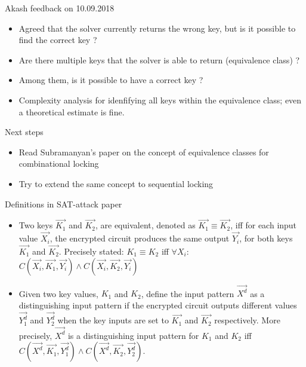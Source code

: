 \begin{frame}{Akash feedback on 10.09.2018}
\begin{itemize}
\item Agreed that the solver currently returns the wrong key, but is it possible to find the correct key ?
\item Are there multiple keys that the solver is able to return (equivalence class) ?
\item Among them, is it possible to have a correct key ?
\item Complexity analysis for idenfifying all keys within the equivalence class; even a theoretical estimate is fine. 
\end{itemize}
\end{frame}

\begin{frame}{Next steps}
	\begin{itemize}
		\item Read Subramanyan's paper on the concept of equivalence classes for combinational locking
		\item Try to \alert{extend} the same concept to sequential locking
	\end{itemize}
\end{frame}

\begin{frame}{Definitions in SAT-attack paper}
	\begin{itemize}
		\item Two keys $\vec{K_1}$ and $\vec{K_2}$, are equivalent, denoted as $\vec{K_1} \equiv \vec{K_2}$, iff for each input value $\vec{X_i}$, the encrypted circuit produces the same output $\vec{Y_i}$, for both keys $\vec{K_1}$ and $\vec{K_2}$. Precisely stated: $K_1 \equiv K_2$ iff $\forall X_i$: $C(\vec{X_i}, \vec{K_1}, \vec{Y_i}) \wedge C(\vec{X_i}, \vec{K_2}, \vec{Y_i})$
		\item Given two key values, $K_1$ and $K_2$, define the input pattern $\vec{X^d}$ as a distinguishing input pattern if the encrypted circuit outputs different values $\vec{Y_1^d}$ and $\vec{Y_2^d}$ when the key inputs are set to $\vec{K_1}$ and $\vec{K_2}$ respectively. More precisely, $\vec{X^d}$ is a distinguishing input pattern for $K_1$ and $K_2$ iff $C(\vec{X^d}, \vec{K_1}, \vec{Y_1^d}) \wedge C(\vec{X^d}, \vec{K_2}, \vec{Y_2^d})$. 
	\end{itemize}
\end{frame}

